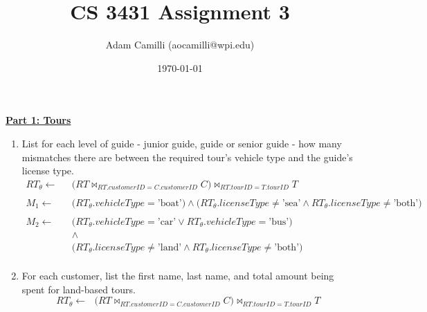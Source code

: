 \documentclass[12pt]{article}
\begin{document}
\title{CS 3431 Assignment 3}
\author{Adam Camilli (aocamilli@wpi.edu)}
\date{\today}
\maketitle
\textbf{\underline{Part 1: Tours}}
\begin{enumerate}
\item List for each level of guide - junior guide, guide or senior guide - how many mismatches there are between the required tour’s vehicle type and the guide's license type. \\
  \begin{align*}
    RT_\theta \leftarrow &\textrm{ } \Big(RT \bowtie_{RT.customerID=C.customerID} C\Big) \bowtie_{RT.tourID=T.tourID} T \\ \\
    M_1 \leftarrow &\textrm{ } \Big(RT_{\theta}.vehicleType = \text{'boat'}\Big) \wedge \Big(RT_{\theta}.licenseType \neq \text{'sea'} \wedge RT_{\theta}.licenseType \neq \text{'both'}\Big) \\ \\
    M_2 \leftarrow &\textrm{ } \Big(RT_{\theta}.vehicleType = \text{'car'} \vee RT_{\theta}.vehicleType = \text{'bus'}\Big) \\
                         &\textrm{ }\wedge \\
                         &\textrm{ }\Big(RT_{\theta}.licenseType \neq \text{'land'} \wedge RT_{\theta}.licenseType \neq \text{'both'}\Big) \\
  \end{align*}
    \begin{tcolorbox}
      \begin{center}
      \end{center}
    \end{tcolorbox}
  \item For each customer, list the first name, last name, and total amount being spent for land-based tours. \\
    \[ RT_\theta \leftarrow \textrm{ } \Big(RT \bowtie_{RT.customerID=C.customerID} C\Big) \bowtie_{RT.tourID=T.tourID} T \]
    \begin{tcolorbox}
      \begin{center}
      \end{center}
    \end{tcolorbox}


\end{enumerate}
\end{document}
